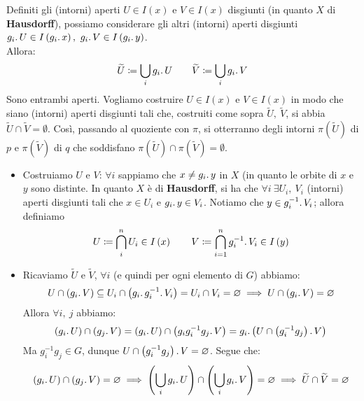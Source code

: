 \begin{demonstration}
\begin{enumerate}[label=\Roman*]
Definiti gli (intorni) aperti $U\in I\left(x\right)$ e $V\in I\left(x\right)$ disgiunti (in quanto $X$ di \textbf{Hausdorff}), possiamo considerare gli altri (intorni) aperti disgiunti $g_i\ldotp U\in I\left(g_i\ldotp x\right),\ g_i\ldotp V\in I\left(g_i\ldotp y\right)$.\\
Allora:
\begin{equation}
\widetilde{U}\coloneqq \union_{i}g_i\ldotp U\qquad \widetilde{V}\coloneqq \union_{i}g_i\ldotp V
\end{equation}
Sono entrambi aperti. Vogliamo costruire $U\in I\left(x\right)$ e $V\in I\left(x\right)$ in modo che siano (intorni) aperti disgiunti tali che, costruiti come sopra $\widetilde{U},\ \widetilde{V}$, si abbia $\widetilde{U}\cap \widetilde{V}=\emptyset$. Così, passando al quoziente con $\pi$, si otterranno degli intorni $\pi\left(\widetilde{U}\right)$ di $p$ e $\pi\left(\widetilde{V}\right)$ di $q$ che soddisfano $\pi\left(\widetilde{U}\right)\cap \pi\left(\widetilde{V}\right)=\emptyset$.\\
\begin{itemize}
\item Costruiamo $U$ e $V$: $\forall i$ sappiamo che $x\neq g_i\ldotp y$ in $X$ (in quanto le orbite di $x$ e $y$ sono distinte. In quanto $X$ è di \textbf{Hausdorff}, si ha che $\forall i\ \exists U_i,\ V_i$ (intorni) aperti disgiunti tali che $x\in U_i$ e $g_i\ldotp y\in V_i$. Notiamo che $y\in g_i^{-1}\ldotp V_i$; allora definiamo
\begin{equation*}
U\coloneqq \inter_{i}^{n}U_i\in I\left(x\right)\qquad V\coloneqq \inter_{i=1}^{n}g_i^{-1}\ldotp V_i\in I\left(y\right)
\end{equation*}
\item Ricaviamo $\widetilde{U}$ e $\widetilde{V}$, $\forall i$ (e quindi per ogni elemento di $G$) abbiamo:
\begin{equation*}
U\cap \left(g_i\ldotp V\right)\subseteq U_i \cap \left(g_i\ldotp g_i^{-1}\ldotp V_i\right)=U_i\cap V_i=\emptyset\implies U\cap \left(g_i\ldotp V\right)=\emptyset
\end{equation*}
Allora $\forall i,\ j$ abbiamo:
\begin{equation*}
	\left(g_i\ldotp U\right)\cap \left(g_j\ldotp V\right)=\left(g_i\ldotp U\right)\cap \left(g_ig_i^{-1}g_j\ldotp V\right)= g_i\ldotp \left(U\cap \left(g_i^{-1}g_j\right)\ldotp V\right)
\end{equation*}
Ma $g_i^{-1}g_j \in G$, dunque $U\cap \left(g_i^{-1}g_j\right)\ldotp V=\emptyset$. Segue che:
\begin{equation*}
	\left(g_i\ldotp U\right)\cap \left(g_j\ldotp V\right)=\emptyset\implies
	\left(\union_{i}g_i\ldotp U\right)\cap \left(\union_{i}g_i\ldotp V\right)=\emptyset\implies \widetilde{U}\cap \widetilde{V}=\emptyset
\end{equation*}	
\end{itemize}
\end{enumerate}
\vspace{-6mm}
\end{demonstration}
